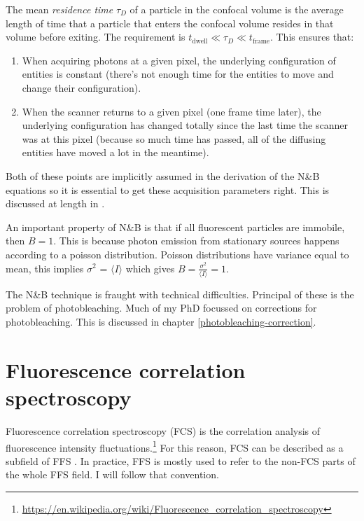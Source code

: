 \documentclass[12pt,]{book}
\providecommand{\tightlist}{%
  \setlength{\itemsep}{0pt}\setlength{\parskip}{0pt}}
\let\rmarkdownfootnote\footnote%
\def\footnote{\protect\rmarkdownfootnote}
\theoremstyle{definition}
\theoremstyle{definition}
\theoremstyle{definition}
\theoremstyle{remark}
\begin{document}
\protect\hypertarget{def:unnamed-chunk-9}{}{\label{def:unnamed-chunk-9} }The
mean \emph{residence time} \(\tau_D\) of a particle in the confocal
volume is the average length of time that a particle that enters the
confocal volume resides in that volume before exiting.
 The requirement is
\(t_\text{dwell} \ll \tau_D \ll t_\text{frame}\). This ensures that:

\begin{enumerate}
\def\labelenumi{\arabic{enumi}.}
\tightlist
\item
  When acquiring photons at a given pixel, the underlying configuration
  of entities is constant (there's not enough time for the entities to
  move and change their configuration).
\item
  When the scanner returns to a given pixel (one frame time later), the
  underlying configuration has changed totally since the last time the
  scanner was at this pixel (because so much time has passed, all of the
  diffusing entities have moved a lot in the meantime).
\end{enumerate}

Both of these points are implicitly assumed in the derivation of the
N\&B equations so it is essential to get these acquisition parameters
right. This is discussed at length in \citet{NBreview}.

An important property of N\&B is that if all fluorescent particles are
immobile, then \(B = 1\). This is because photon emission from
stationary sources happens according to a poisson distribution. Poisson
distributions have variance equal to mean, this implies \(\sigma^2\) =
\(\langle I \rangle\) which gives
\(B = \frac{\sigma^2}{\langle I \rangle} = 1\).

The N\&B technique is fraught with technical difficulties. Principal of
these is the problem of photobleaching. Much of my PhD focussed on
corrections for photobleaching. This is discussed in chapter
\ref{photobleaching-correction}.

\section{Fluorescence correlation
spectroscopy}\label{fluorescence-correlation-spectroscopy}

Fluorescence correlation spectroscopy (FCS) is the correlation analysis
of fluorescence intensity fluctuations.\footnote{\url{https://en.wikipedia.org/wiki/Fluorescence_correlation_spectroscopy}}
For this reason, FCS can be described as a subfield of FFS
\citep{FFSnewage}. In practice, FFS is mostly used to refer to the
non-FCS parts of the whole FFS field. I will follow that convention.
\end{document}
